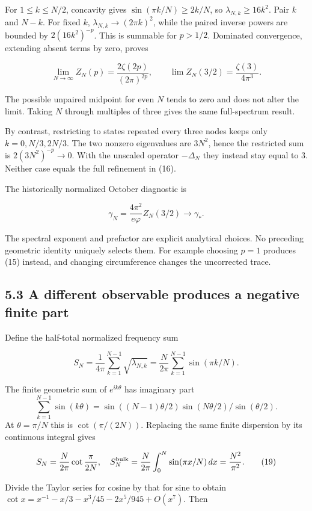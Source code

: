 \documentclass[11pt,a4paper]{article}
\begin{document}
For $1\leq k\leq N/2$, concavity gives $\sin(\pi k/N)\geq2k/N$, so $\lambda_{N,k}\geq16k^2$. Pair $k$ and $N-k$. For fixed $k$, $\lambda_{N,k}\to(2\pi k)^2$, while the paired inverse powers are bounded by $2(16k^2)^{-p}$. This is summable for $p>1/2$. Dominated convergence, extending absent terms by zero, proves


\[
\lim_{N\to\infty}Z_N(p)=\frac{2\zeta(2p)}{(2\pi)^{2p}},
\qquad
\lim Z_N(3/2)=\frac{\zeta(3)}{4\pi^3}. \tag{16}
\]

The possible unpaired midpoint for even $N$ tends to zero and does not alter the limit. Taking $N$ through multiples of three gives the same full-spectrum result.


By contrast, restricting to states repeated every three nodes keeps only $k=0,N/3,2N/3$. The two nonzero eigenvalues are $3N^2$, hence the restricted sum is $2(3N^2)^{-p}\to0$. With the unscaled operator $-\Delta_N$ they instead stay equal to $3$. Neither case equals the full refinement in (16).


The historically normalized October diagnostic is


\[
\gamma_N=\frac{4\pi^2}{e\varphi}Z_N(3/2)
\longrightarrow\gamma_*. \tag{17}
\]

The spectral exponent and prefactor are explicit analytical choices. No preceding geometric identity uniquely selects them. For example choosing $p=1$ produces (15) instead, and changing circumference changes the uncorrected trace.


\subsection*{5.3 A different observable produces a negative finite part}

Define the half-total normalized frequency sum


\[
S_N=\frac1{4\pi}\sum_{k=1}^{N-1}\sqrt{\lambda_{N,k}}
=\frac N{2\pi}\sum_{k=1}^{N-1}\sin(\pi k/N). \tag{18}
\]

The finite geometric sum of $e^{ik\theta}$ has imaginary part
\[\sum_{k=1}^{N-1}\sin(k\theta)
=\sin((N-1)\theta/2)\sin(N\theta/2)/\sin(\theta/2).\]
At $\theta=\pi/N$ this is $\cot(\pi/(2N))$. Replacing the same finite dispersion by its continuous integral gives


\[
S_N=\frac N{2\pi}\cot\frac{\pi}{2N},\quad
S_N^{\rm bulk}=\frac N{2\pi}\int_0^N\sin(\pi x/N)\,dx
=\frac{N^2}{\pi^2}. \tag{19}
\]

Divide the Taylor series for cosine by that for sine to obtain
$\cot x=x^{-1}-x/3-x^3/45-2x^5/945+O(x^7)$.
Then
\end{document}
